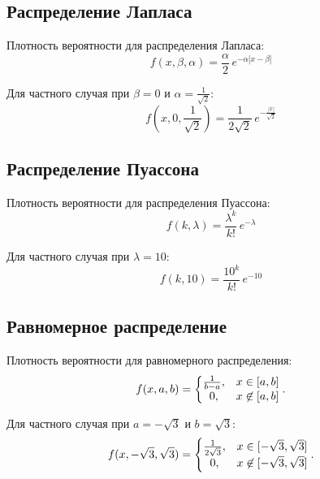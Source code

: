 \subsection{Распределение Лапласа}
Плотность вероятности для распределения Лапласа:
\begin{equation} 
f(x, \beta, \alpha) = \frac{\alpha}{2} \, e^{-\alpha|x - \beta|}
\end{equation}

Для частного случая при \( \beta = 0 \) и \( \alpha = \frac{1}{\sqrt{2}} \):
\begin{equation} 
f(x, 0, \frac{1}{\sqrt{2}}) = \frac{1}{2\sqrt{2}} \, e^{-\frac{|x|}{\sqrt{2}}}
\end{equation}


\subsection{Распределение Пуассона}

Плотность вероятности для распределения Пуассона:
\begin{equation} 
f(k, \lambda) = \frac{\lambda^k}{k!}\, e^{-\lambda}
\end{equation}

Для частного случая при \( \lambda = 10 \):
\begin{equation} 
f(k, 10) = \frac{10^k}{k!}\, e^{-10}
\end{equation}

\subsection{Равномерное распределение}
Плотность вероятности для равномерного распределения:
\begin{equation} 
f(x, a, b) = \left\{
\begin{matrix}
{1 \over b-a}, & x\in [a,b] \\
0, & x\not\in [a,b]
\end{matrix}
\right..
\end{equation}

Для частного случая при \( a = -\sqrt{3} \) и \( b = \sqrt{3} \):
\begin{equation} 
f(x, -\sqrt{3}, \sqrt{3}) = \left\{
\begin{matrix}
{1 \over 2\sqrt{3}}, & x\in [-\sqrt{3},\sqrt{3}] \\
0, & x\not\in [-\sqrt{3},\sqrt{3}]
\end{matrix}
\right..
\end{equation}


